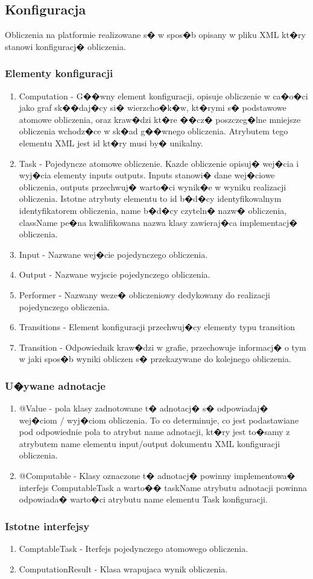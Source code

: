 \documentclass{article}
\begin{document}
\subsection{Konfiguracja}
Obliczenia na platformie realizowane s� w spos�b opisany w pliku XML kt�ry stanowi konfiguracj� obliczenia.
\subsubsection{Elementy konfiguracji}
\begin{enumerate}
\item{Computation} -
G��wny element konfiguracji, opisuje obliczenie w ca�o�ci jako graf sk��daj�cy si� wierzcho�k�w, kt�rymi s� podstawowe atomowe obliczenia, oraz kraw�dzi
kt�re ��cz� poszczeg�lne mniejsze obliczenia wchodz�ce w sk�ad g��wnego obliczenia. Atrybutem tego elementu XML jest id kt�ry musi by� unikalny.
\item{Task} -
Pojedyncze atomowe obliczenie. Kazde obliczenie opisuj� wej�cia i wyj�cia elementy inputs outputs. Inputs stanowi� dane wej�ciowe obliczenia, outputs
przechwuj� warto�ci wynik�e w wyniku realizacji obliczenia. Istotne atrybuty elementu to id b�d�cy identyfikowalnym identyfikatorem obliczenia, name
b�d�cy czyteln� nazw� obliczenia, className pe�na kwalifikowana nazwa klasy zawieraj�ca implementacj� obliczenia. 
\item{Input} -
Nazwane wej�cie pojedynczego obliczenia.
\item{Output} -
Nazwane wyjscie pojedynczego obliczenia.
\item{Performer} -
Nazwany weze� obliczeniowy dedykowany do realizacji pojedynczego obliczenia.
\item{Transitions} -
Element konfiguracji przechwuj�cy elementy typu transition
\item{Transition} -
Odpowiednik kraw�dzi w grafie, przechowuje informacj� o tym w jaki spos�b wyniki obliczen s� przekazywane do kolejnego obliczenia.
\end{enumerate}
\subsubsection{U�ywane adnotacje}
\begin{enumerate}
\item{@Value} - pola klasy zadnotowane t� adnotacj� s� odpowiadaj� wej�ciom / wyj�ciom obliczenia. To co determinuje, co jest podastawiane 
pod odpowiednie pola to atrybut name adnotacji, kt�ry jest to�samy z atrybutem name elementu input/output dokumentu XML konfiguracji obliczenia.
\item{@Computable} - Klasy oznaczone t� adnotacj� powinny implementowa� interfejs ComputableTask a warto�� taskName atrybutu adnotacji powinna odpowiada�
warto�ci atrybutu name elementu Task konfiguracji.
\end{enumerate}
\subsubsection{Istotne interfejsy}
\begin{enumerate}
\item{ComptableTask} - Iterfejs pojedynczego atomowego obliczenia. 
\item{ComputationResult} - Klasa wrapujaca wynik obliczenia.
\end{enumerate}
\end{document}
